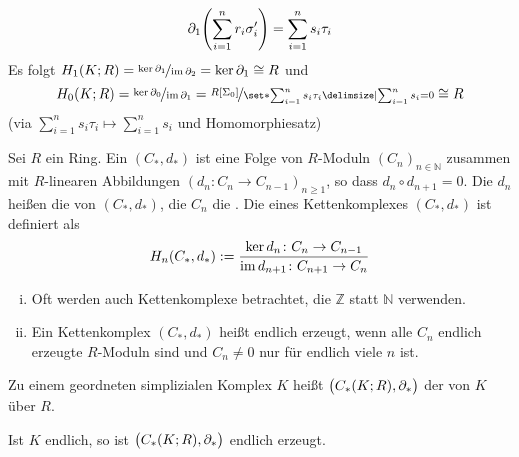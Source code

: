 \begin{beispiel}
\begin{enumerate}[(1)]
		\[
			\partial_1 \enbrace*{\sum_{i=1}^{n} r_i \sigma_i'} = \sum_{i=1}^{n} s_i \tau_i 
		\]
		Es folgt $ %
		H_1(K;R) = \nicefrac{\ker \partial_1}{\im \partial_2} = \ker \partial_1 \cong R %
		$ und 
		\[
			H_0(K;R) = \nicefrac{\ker \partial_0}{\im \partial_1} = \nicefrac{R[\Sigma_0]}{ \set*{\sum_{i=1}^{n} s_i \tau_i \given \sum_{i=1}^{n} s_i =0} } \cong R 
		\]
		(via $\sum_{i=1}^{n} s_i \tau_i \longmapsto \sum_{i=1}^{n} s_i$ und Homomorphiesatz)
	\end{enumerate}
\end{beispiel}

\begin{definition}[{name=[{$R$-Kettenkomplex, $n$-te Homologie eines $R$-Kettenkomplexes}]}]
	Sei $R$ ein Ring. Ein  $(C_*, d_*)$ ist eine Folge von $R$-Moduln $(C_n)_{n \in \mathbb{N}}$ zusammen mit $R$-linearen Abbildungen $(d_n \colon C_n \to C_{n-1})_{n \ge 1}$, so dass $d_n \circ d_{n+1} = 0$. 
	Die $d_n$ heißen die  von $(C_*,d_*)$, die $C_n$ die .
	Die  eines Kettenkomplexes $(C_*,d_*)$ ist definiert als
	\[
		H_n(C_*, d_*) := \frac{\ker d_n \colon C_n \to C_{n-1}}{\im d_{n+1} \colon C_{n+1} \to C_n} 
	\]
\end{definition}

\begin{bemerkung}
	\leavevmode
	\begin{enumerate}[(i)]
		\item Oft werden auch Kettenkomplexe betrachtet, die $\mathbb{Z}$ statt $\mathbb{N}$ verwenden.
		\item Ein Kettenkomplex $(C_*,d_*)$ heißt endlich erzeugt, wenn alle $C_n$ endlich erzeugte $R$-Moduln sind und $C_n \not= 0$ nur für endlich viele $n$ ist.
	\end{enumerate}
\end{bemerkung}

\begin{definition}[{name=[Simplizialer Kettenkomplex]}]
	Zu einem geordneten simplizialen Komplex $K$ heißt $\enbrace[\big]{C_*(K;R), \partial_*}$ der  von $K$ über $R$.
\end{definition}

Ist $K$ endlich, so ist $\enbrace[\big]{C_*(K;R), \partial_*}$ endlich erzeugt.


